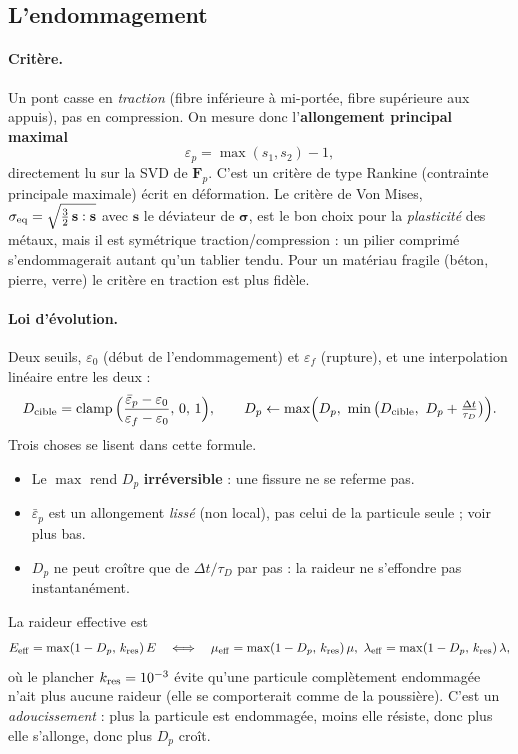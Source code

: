\documentclass[11pt,a4paper]{article}
\newcommand{\bm}[1]{\boldsymbol{#1}}
\begin{document}
\subsection{L'endommagement}
\label{sec:damage}

\paragraph{Critère.} Un pont casse en \emph{traction} (fibre inférieure à mi-portée, fibre supérieure
aux appuis), pas en compression. On mesure donc l'\textbf{allongement principal maximal}
\[
  \varepsilon_p = \max(s_1, s_2) - 1,
\]
directement lu sur la SVD de $\mathbf F_p$. C'est un critère de type Rankine (contrainte principale
maximale) écrit en déformation. Le critère de Von Mises,
$\sigma_{\rm eq} = \sqrt{\tfrac32\,\mathbf s:\mathbf s}$ avec $\mathbf s$ le déviateur de $\bm\sigma$,
est le bon choix pour la \emph{plasticité} des métaux, mais il est symétrique traction/compression :
un pilier comprimé s'endommagerait autant qu'un tablier tendu. Pour un matériau fragile
(béton, pierre, verre) le critère en traction est plus fidèle.

\paragraph{Loi d'évolution.} Deux seuils, $\varepsilon_0$ (début de l'endommagement) et
$\varepsilon_f$ (rupture), et une interpolation linéaire entre les deux :
\[
  D_{\rm cible} = \operatorname{clamp}\Big(\frac{\bar\varepsilon_p - \varepsilon_0}{\varepsilon_f - \varepsilon_0},\,0,\,1\Big),
  \qquad
  D_p \leftarrow \max\!\Big(D_p,\ \min\big(D_{\rm cible},\ D_p + \tfrac{\Delta t}{\tau_D}\big)\Big).
\]
Trois choses se lisent dans cette formule.
\begin{itemize}
  \item Le $\max$ rend $D_p$ \textbf{irréversible} : une fissure ne se referme pas.
  \item $\bar\varepsilon_p$ est un allongement \emph{lissé} (non local), pas celui de la particule
        seule ; voir plus bas.
  \item $D_p$ ne peut croître que de $\Delta t/\tau_D$ par pas : la raideur ne s'effondre pas
        instantanément.
\end{itemize}
La raideur effective est
\[
  E_{\rm eff} = \max(1 - D_p,\,k_{\rm res})\,E \quad\Longleftrightarrow\quad
  \mu_{\rm eff} = \max(1-D_p,\,k_{\rm res})\,\mu,\ \lambda_{\rm eff} = \max(1-D_p,\,k_{\rm res})\,\lambda,
\]
où le plancher $k_{\rm res} = 10^{-3}$ évite qu'une particule complètement endommagée n'ait plus
aucune raideur (elle se comporterait comme de la poussière).
C'est un \emph{adoucissement} : plus la particule est endommagée, moins elle résiste, donc plus elle
s'allonge, donc plus $D_p$ croît.
\end{document}
